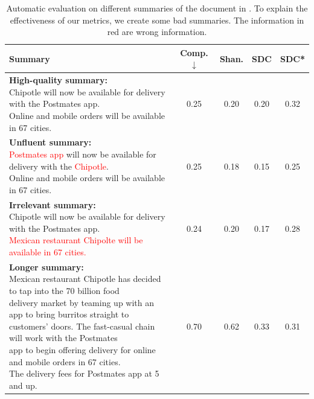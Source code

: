 \begin{table}[th]
	\centering
	\small
	\begin{tabular}{|l|c|c|c|c|}
		\hline
		\bf Summary &\bf  Comp. $\downarrow$& \bf Shan. & \bf SDC & \bf SDC* \\
		\hline
		\makecell[l]{
			{\bf High-quality summary:} \\
			Chipotle will now be available for delivery with the Postmates app. \\ 
			Online and mobile orders will be available in 67 cities.
		}
		& 0.25& 0.20 & 0.20 & 0.32\\
		\hline
		\makecell[l]{
			{\bf Unfluent summary: }\\
			\textcolor{red}{Postmates app} will now be available for delivery with the \textcolor{red}{Chipotle}. \\ 
			Online and mobile orders will be available in 67 cities.
		}
		& 0.25& 0.18 & 0.15& 0.25\\
		\hline
		\makecell[l]{
			{\bf Irrelevant summary: }\\
			Chipotle will now be available for delivery with the Postmates app. \\ 
			\textcolor{red}{Mexican restaurant Chipolte will be available in 67 cities.
		}}
		& 0.24 & 0.20 & 0.17 &  0.28\\
		\hline
		\makecell[l]{
			{\bf Longer summary: }\\
			Mexican restaurant Chipotle has decided to tap into the 70 billion food\\ delivery market by teaming up with an app to bring burritos straight to\\ customers' doors. The fast-casual chain will work with the Postmates \\ app to begin offering delivery for online and mobile orders in 67 cities. \\
			The delivery fees for Postmates app at 5 and up.
		}
		& 0.70 & 0.62 & 0.33 & 0.31 \\
		\hline
	\end{tabular}
	\caption{Automatic evaluation on different summaries of the document in
		.
		To explain the effectiveness of our metrics,
		we create some bad summaries. The information in red are wrong information.}
	\label{tab:abl}
\end{table}

